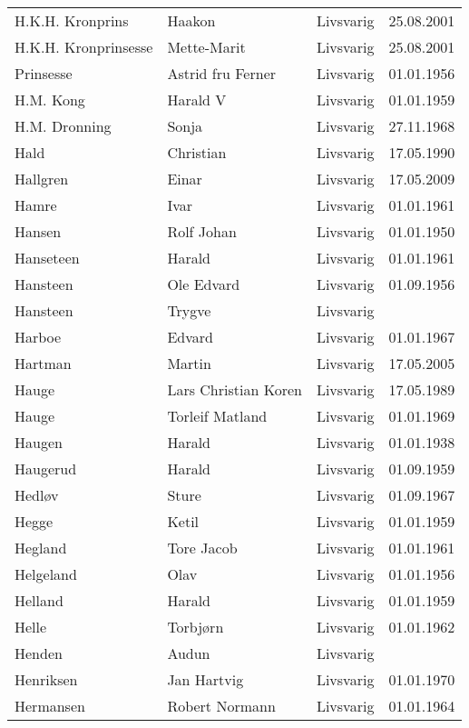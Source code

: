 \begin{longtable}{llll}
        H.K.H. Kronprins	&	Haakon 	&	Livsvarig	&	25.08.2001	\\
        H.K.H. Kronprinsesse	&	Mette-Marit 	&	Livsvarig	&	25.08.2001	\\
        Prinsesse	&	Astrid fru Ferner	&	Livsvarig 	&	01.01.1956	\\
        H.M. Kong	&	Harald V	&	Livsvarig 	&	01.01.1959	\\
        H.M. Dronning	&	Sonja	&	Livsvarig 	&	27.11.1968	\\
        Hald	&	Christian	&	Livsvarig 	&	17.05.1990	\\
        Hallgren	&	Einar	&	Livsvarig	&	17.05.2009	\\
        Hamre	&	Ivar	&	Livsvarig 	&	01.01.1961	\\
        Hansen	&	Rolf Johan	&	Livsvarig 	&	01.01.1950	\\
        Hanseteen	&	Harald	&	Livsvarig 	&	01.01.1961	\\
        Hansteen	&	Ole Edvard	&	Livsvarig 	&	01.09.1956	\\
        Hansteen	&	Trygve	&	Livsvarig 	&		\\
        Harboe	&	Edvard	&	Livsvarig 	&	01.01.1967	\\
        Hartman 	&	Martin	&	Livsvarig	&	17.05.2005	\\
        Hauge	&	Lars Christian Koren	&	Livsvarig 	&	17.05.1989	\\
        Hauge	&	Torleif Matland	&	Livsvarig 	&	01.01.1969	\\
        Haugen	&	Harald	&	Livsvarig 	&	01.01.1938	\\
        Haugerud	&	Harald	&	Livsvarig 	&	01.09.1959	\\
        Hedløv	&	Sture	&	Livsvarig 	&	01.09.1967	\\
        Hegge	&	Ketil	&	Livsvarig 	&	01.01.1959	\\
        Hegland	&	Tore Jacob	&	Livsvarig 	&	01.01.1961	\\
        Helgeland	&	Olav	&	Livsvarig 	&	01.01.1956	\\
        Helland	&	Harald	&	Livsvarig 	&	01.01.1959	\\
        Helle	&	Torbjørn	&	Livsvarig 	&	01.01.1962	\\
        Henden	&	Audun	&	Livsvarig 	&		\\
        Henriksen	&	Jan Hartvig	&	Livsvarig 	&	01.01.1970	\\
        Hermansen	&	Robert Normann	&	Livsvarig 	&	01.01.1964	\\

\end{longtable}
